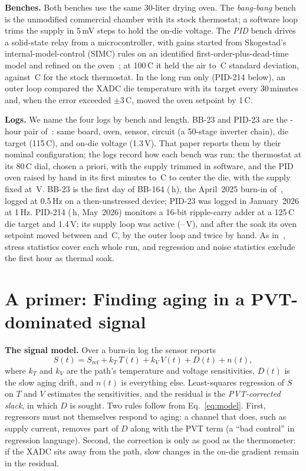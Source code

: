 \documentclass[10pt,twocolumn]{article}
\newcommand{\degC}{\,\textdegree C}
\begin{document}
\textbf{Benches.} Both benches use the same 30-liter drying oven. The \emph{bang-bang} bench is the unmodified commercial chamber with its stock thermostat; a software loop trims the supply in 5\,mV steps to hold the on-die voltage. The \emph{PID} bench drives a solid-state relay from a microcontroller, with gains started from Skogestad's internal-model-control (SIMC) rules on an identified first-order-plus-dead-time model and refined on the oven~\cite{sbcci26}; at 100\degC{} it held the air to \vSdTuned\degC{} standard deviation, against \vSdThermo\degC{} for the stock thermostat. In the long run only (PID-214 below), an outer loop compared the XADC die temperature with its target every 30\,minutes and, when the error exceeded $\pm3$\degC, moved the oven setpoint by 1\degC.

\textbf{Logs.} We name the four logs by bench and length. BB-23 and PID-23 are the \vDurPair-hour pair of~\cite{sbcci26}: same board, oven, sensor, circuit (a 50-stage inverter chain), die target (115\degC), and on-die voltage (1.3\,V). That paper reports them by their nominal configuration; the logs record how each bench was run: the thermostat at its 80\degC{} dial, chosen a priori, with the supply trimmed in software, and the PID oven raised by hand in its first minutes to \vPIDspMax\degC{} to center the die, with the supply fixed at \vVpsuPID\,V. BB-23 is the first day of BB-164 (\vDurBBlong\,h), the April~2025 burn-in of~\cite{sbcci25}, logged at 0.5\,Hz on a then-unstressed device; PID-23 was logged in January~2026 at 1\,Hz. PID-214 (\vDurRCA\,h, May~2026) monitors a 16-bit ripple-carry adder at a 125\degC{} die target and 1.4\,V; its supply loop was active (\vRCApsuMin--\vRCApsuMax\,V), and after the soak its oven setpoint moved between \vRCAspMin{} and \vRCAspMax\degC, by the outer loop and twice by hand. As in~\cite{sbcci26}, stress statistics cover each whole run, and regression and noise statistics exclude the first hour as thermal soak.

\section{A primer: Finding aging in a PVT-dominated signal}

\textbf{The signal model.} Over a burn-in log the sensor reports
\begin{equation}
S(t)=S_{\mathrm{ref}}+k_T\,T(t)+k_V\,V(t)+D(t)+n(t),
\label{eq:model}
\end{equation}
where $k_T$ and $k_V$ are the path's temperature and voltage sensitivities, $D(t)$ is the slow aging drift, and $n(t)$ is everything else. Least-squares regression of $S$ on $T$ and $V$ estimates the sensitivities, and the residual is the \emph{PVT-corrected slack}, in which $D$ is sought. Two rules follow from Eq.~\eqref{eq:model}. First, regressors must not themselves respond to aging: a channel that does, such as supply current, removes part of $D$ along with the PVT term (a ``bad control'' in regression language). Second, the correction is only as good as the thermometer: if the XADC sits away from the path, slow changes in the on-die gradient remain in the residual.
\end{document}
